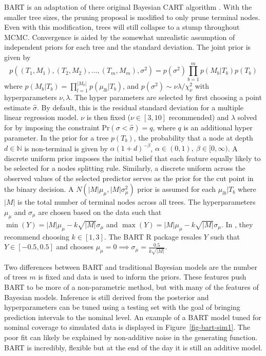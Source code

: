 \documentclass[
  12pt,
  letterpaper,
  DIV=11,
  numbers=noendperiod]{scrartcl}
\begin{document}
BART is an adaptation of there original Bayesian CART algorithm
\cite{bayes_cart}. With the smaller tree sizes, the pruning proposal is
modified to only prune terminal nodes. Even with this modification,
trees will still collapse to a stump throughout MCMC. Convergence is
aided by the somewhat unrealistic assumption of independent priors for
each tree and the standard deviation. The joint prior is given by
\[p((T_1, M_1), (T_2, M_2),...,(T_m, M_m),\sigma^2)=p(\sigma^2)\prod_{b=1}^mp(M_b|T_b)p(T_b)\]
where \(p(M_b|T_b)=\prod_{l=1}^{|M_b|}p(\mu_{lb}|T_b)\), and
\(p(\sigma^2)\sim\nu\lambda/\chi^2_\nu\) with hyperparameters
\(\nu,\lambda\). The hyper parameters are selected by first choosing a
point estimate \(\hat\sigma\). By default, this is the residual standard
deviation for a multiple linear regression model. \(\nu\) is then fixed
(\(\nu\in[3,10]\) recommended) and \(\lambda\) solved for by imposing
the constraint \(\text{Pr}(\sigma<\hat\sigma)=q\), where \(q\) is an
additional hyper parameter. In the prior for a tree \(p(T_b)\), the
probability that a node at depth \(d\in\mathbb{N}\) is non-terminal is
given by \(\alpha(1+d)^{-\beta}\),
\(\alpha\in(0,1),\ \beta\in[0,\infty)\). A discrete uniform prior
imposes the initial belief that each feature equally likely to be
selected for a nodes splitting rule. Similarly, a discrete uniform
across the observed values of the selected predictor serves as the prior
for the cut point in the binary decision. A
\(N(|M|\mu_\mu,|M|\sigma^2_\mu)\) prior is assumed for each
\(\mu_{lb}|T_b\) where \(|M|\) is the total number of terminal nodes
across all trees. The hyperparameters \(\mu_\mu\) and \(\sigma_\mu\) are
chosen based on the data such that
\(\min(Y)=|M|\mu_\mu-k\sqrt{|M|}\sigma_\mu\) and
\(\max(Y)=|M|\mu_\mu-k\sqrt{|M|}\sigma_\mu\). In \cite{bart_paper}, they
recommend choosing \(k\in[1,3]\). The BART R package \cite{bart_r}
resales \(Y\) such that \(Y\in[-0.5, 0.5]\) and chooses
\(\mu_\mu=0\implies\sigma_\mu=\frac{0.5}{k\sqrt{|M|}}\).

Two differences between BART and traditional Bayesian models are the
number of trees \(m\) is fixed and data is used to inform the priors.
These features push BART to be more of a non-parametric method, but with
many of the features of Bayesian models. Inference is still derived from
the posterior and hyperparameters can be tuned using a testing set with
the goal of bringing prediction intervals to the nominal level. An
example of a BART model tuned for nominal coverage to simulated data is
displayed in Figure~\ref{fig-bart-sim1}. The poor fit can likely be
explained by non-additive noise in the generating function. BART is
incredibly, flexible but at the end of the day it is still an additive
model.
\end{document}
